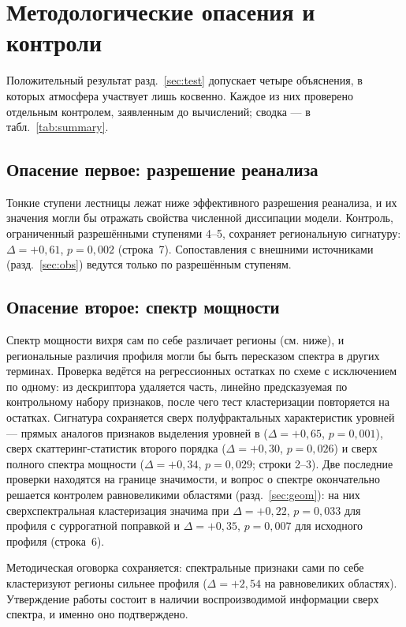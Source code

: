 \documentclass[11pt,a4paper]{article}
\begin{document}
\section{Методологические опасения и контроли}
\label{sec:controls}

Положительный результат разд.~\ref{sec:test} допускает четыре объяснения, в которых атмосфера участвует лишь косвенно. Каждое из них проверено отдельным контролем, заявленным до вычислений; сводка --- в табл.~\ref{tab:summary}.

\subsection{Опасение первое: разрешение реанализа}

Тонкие ступени лестницы лежат ниже эффективного разрешения реанализа, и их значения могли бы отражать свойства численной диссипации модели. Контроль, ограниченный разрешёнными ступенями 4--5, сохраняет региональную сигнатуру: $\Delta=+0{,}61$, $p=0{,}002$ (строка~7). Сопоставления с внешними источниками (разд.~\ref{sec:obs}) ведутся только по разрешённым ступеням.

\subsection{Опасение второе: спектр мощности}

Спектр мощности вихря сам по себе различает регионы (см. ниже), и региональные различия профиля могли бы быть пересказом спектра в других терминах. Проверка ведётся на регрессионных остатках по схеме с исключением по одному: из дескриптора удаляется часть, линейно предсказуемая по контрольному набору признаков, после чего тест кластеризации повторяется на остатках. Сигнатура сохраняется сверх полуфрактальных характеристик уровней --- прямых аналогов признаков выделения уровней в \cite{Krenke2019} ($\Delta=+0{,}65$, $p=0{,}001$), сверх скаттеринг-статистик второго порядка \cite{Cheng2024} ($\Delta=+0{,}30$, $p=0{,}026$) и сверх полного спектра мощности ($\Delta=+0{,}34$, $p=0{,}029$; строки 2--3). Две последние проверки находятся на границе значимости, и вопрос о спектре окончательно решается контролем равновеликими областями (разд.~\ref{sec:geom}): на них сверхспектральная кластеризация значима при $\Delta=+0{,}22$, $p=0{,}033$ для профиля с суррогатной поправкой и $\Delta=+0{,}35$, $p=0{,}007$ для исходного профиля (строка~6).

Методическая оговорка сохраняется: спектральные признаки сами по себе кластеризуют регионы сильнее профиля ($\Delta=+2{,}54$ на равновеликих областях). Утверждение работы состоит в наличии воспроизводимой информации сверх спектра, и именно оно подтверждено.
\end{document}
